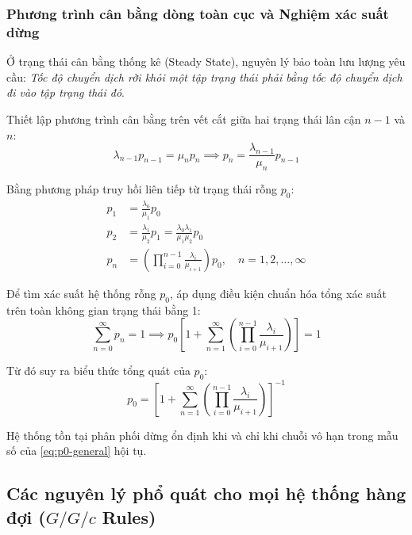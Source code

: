 \subsubsection{Phương trình cân bằng dòng toàn cục và Nghiệm xác suất dừng}

\hspace{0.5cm}Ở trạng thái cân bằng thống kê (Steady State), nguyên lý bảo toàn lưu lượng yêu cầu: \textit{Tốc độ chuyển dịch rời khỏi một tập trạng thái phải bằng tốc độ chuyển dịch đi vào tập trạng thái đó}.

Thiết lập phương trình cân bằng trên vết cắt giữa hai trạng thái lân cận $n-1$ và $n$:
\begin{equation}
    \lambda_{n-1} p_{n-1} = \mu_n p_n \implies p_n = \frac{\lambda_{n-1}}{\mu_n} p_{n-1}
\end{equation}

Bằng phương pháp truy hồi liên tiếp từ trạng thái rỗng $p_0$:
\begin{align}
    p_1 &= \frac{\lambda_0}{\mu_1} p_0 \\
    p_2 &= \frac{\lambda_1}{\mu_2} p_1 = \frac{\lambda_0 \lambda_1}{\mu_1 \mu_2} p_0 \\
    p_n &= \left( \prod_{i=0}^{n-1} \frac{\lambda_i}{\mu_{i+1}} \right) p_0, \quad n = 1, 2, \dots, \infty
    \label{eq:steady-state-pn}
\end{align}

Để tìm xác suất hệ thống rỗng $p_0$, áp dụng điều kiện chuẩn hóa tổng xác suất trên toàn không gian trạng thái bằng 1:
\begin{equation}
    \sum_{n=0}^\infty p_n = 1 \implies p_0 \left[ 1 + \sum_{n=1}^\infty \left( \prod_{i=0}^{n-1} \frac{\lambda_i}{\mu_{i+1}} \right) \right] = 1
\end{equation}

Từ đó suy ra biểu thức tổng quát của $p_0$:
\begin{equation}
    p_0 = \left[ 1 + \sum_{n=1}^\infty \left( \prod_{i=0}^{n-1} \frac{\lambda_i}{\mu_{i+1}} \right) \right]^{-1}
    \label{eq:p0-general}
\end{equation}

Hệ thống tồn tại phân phối dừng ổn định khi và chỉ khi chuỗi vô hạn trong mẫu số của \eqref{eq:p0-general} hội tụ.

\subsection{Các nguyên lý phổ quát cho mọi hệ thống hàng đợi (\texorpdfstring{$G/G/c$}{G/G/c} Rules)}
\label{subsec:rules-all-queues}

